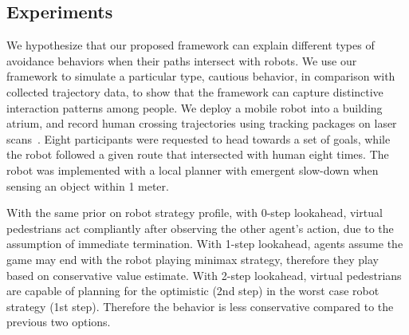\documentclass[letterpaper, 10 pt, conference]{ieeeconf}  %
\begin{document}

\vspace{-.4em}
\subsection{Experiments}
\vspace{-.2em}
We hypothesize that our proposed framework can explain different types of 
avoidance behaviors when their paths intersect with robots. We use our 
framework to simulate a particular type, cautious behavior, in comparison with 
collected trajectory data, to show that the framework can capture distinctive 
interaction patterns among people. We deploy a mobile robot into a building atrium, and record human crossing 
trajectories using tracking packages on laser scans~\cite{leigh2015person}. 
Eight participants were requested to head towards a set of goals, while the 
robot followed a given route that intersected with human eight times.
The robot was implemented with a 
local planner with emergent slow-down when sensing an object within 1 meter. 

With the same prior on robot strategy profile, with 0-step lookahead, 
virtual pedestrians act compliantly after observing the other agent's action, 
due to the assumption of immediate termination. With 1-step lookahead, agents assume 
the game may end with the robot playing minimax strategy, therefore they play 
based on conservative value estimate. With 2-step lookahead, virtual 
pedestrians are capable of planning for the optimistic (2nd step) in the 
worst case robot strategy (1st step). Therefore the behavior is less 
conservative compared to the previous two options. 
\end{document}
